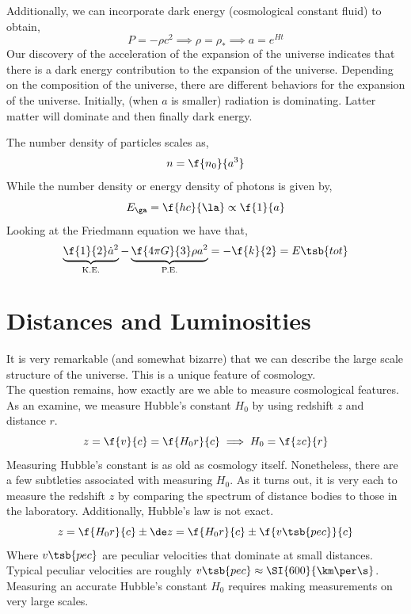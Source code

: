 \documentclass{article}
\begin{document}
Additionally, we can incorporate dark energy (cosmological constant fluid) to obtain,
\[ P = - \rho c^2 \implies \rho = \rho_{*} \implies a = e^{Ht}\]
Our discovery of the acceleration of the expansion of the universe indicates that there is a dark energy contribution to the expansion of the universe. Depending on the composition of the universe, there are different behaviors for the expansion of the universe. Initially, (when $a$ is smaller) radiation is dominating. Latter matter will dominate and then finally dark energy.
\begin{center}
\end{center}
The number density of particles scales as,
\[ n = \f{n_0}{a^3} \]
While the number density or energy density of photons is given by,
\[ E_{\ga} = \f{hc}{\la} \propto \f{1}{a} \]
Looking at the Friedmann equation we have that,
\[ \underbrace{\f{1}{2} \dot a^2}_{\text{K.E.}} - \underbrace{\f{4 \pi G}{3} \rho a^2}_{\text{P.E.}} = -\f{k}{2} = E\tsb{tot} \]
\section{Distances and Luminosities}
It is very remarkable (and somewhat bizarre) that we can describe the large scale structure of the universe. This is a unique feature of cosmology. \\

The question remains, how exactly are we able to measure cosmological features. As an examine, we measure Hubble's constant $H_{0}$ by using redshift $z$ and distance $r$.
\[ z = \f{v}{c} = \f{H_0 r}{c} \implies H_0 = \f{zc}{r} \]
Measuring Hubble's constant is as old as cosmology itself. Nonetheless, there are a few subtleties associated with measuring $H_0$. As it turns out, it is very each to measure the redshift $z$ by comparing the spectrum of distance bodies to those in the laboratory. Additionally, Hubble's law is not exact.
\[ z = \f{H_0 r}{c} \pm \de z = \f{H_0 r}{c} \pm \f{v\tsb{pec}}{c} \]
Where $v\tsb{pec}$ are peculiar velocities that dominate at small distances. Typical peculiar velocities are roughly $v\tsb{pec} \approx \SI{600}{\km \per \s}$. Measuring an accurate Hubble's constant $H_0$ requires making measurements on very large scales. \\
\end{document}
